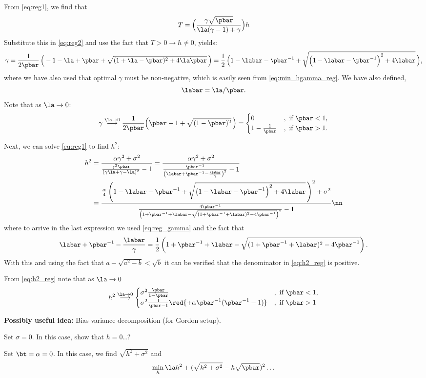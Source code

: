 From \eqref{eq:reg1}, we find that 
\begin{align}
T =\Big( \frac{\gamma\sqrt{\pbar}}{\la(\gamma-1)+\gamma}\Big) h
\end{align}
Substitute this in \eqref{eq:reg2} and use the fact that $T>0\rightarrow h\neq 0$, yields:
\begin{align}
\gamma = \frac{1}{2\pbar}\,\Big( -1 - \la + \pbar + \sqrt{(1+\la-\pbar)^2+4\la \pbar} \,\Big) = \frac{1}{2}\,\Big( 1 - \labar -\pbar^{-1} + \sqrt{\Big(1 - \labar-\pbar^{-1} \Big)^2+4\labar} \,\Big)\label{eq:reg_gamma},
\end{align}
where we have also used that optimal $\gamma$ must be non-negative, which is easily seen from \eqref{eq:min_hgamma_reg}. We have also defined,
$$
\labar = \la/\pbar. 
$$
 Note that as $\la\rightarrow0$:
$$
\gamma \stackrel{\la\rightarrow0}{\longrightarrow}  \frac{1}{2\pbar}\Big( \pbar - 1 + \sqrt{(1-\pbar)^2} \,\Big) = \begin{cases}
0 &, \text{ if } \pbar<1,\\
1-\frac{1}{\pbar} &, \text{ if } \pbar>1.
\end{cases}
$$

Next, we can solve \eqref{eq:reg1} to find $h^2$:
\begin{align}\label{eq:h2_reg}
h^2 &= \frac{\alpha\gamma^2+\sigma^2}{\frac{\gamma^2 \pbar}{(\gamma\la+\gamma-\la)^2}-1} = \frac{\alpha\gamma^2+\sigma^2}{\frac{\pbar^{-1}}{\left(\labar+\pbar^{-1}-\frac{\labar}{\gamma}\right)^2}-1}\\
&= \frac{\frac{\alpha}{4}\left( 1 - \labar -\pbar^{-1} + \sqrt{\big(1 - \labar-\pbar^{-1} \Big)^2+4\labar} \,\right)^2 + \sigma^2}{\frac{4\pbar^{-1}}{\left(1+\pbar^{-1} + \labar - \sqrt{(1+\pbar^{-1} + \labar)^2-4\pbar^{-1}} \right)^2}-1}\nn
\end{align}
where to arrive in the last expression we used \eqref{eq:reg_gamma} and the fact that
$$
\labar+\pbar^{-1}-\frac{\labar}{\gamma} = \frac{1}{2}\left(1+\pbar^{-1} + \labar - \sqrt{(1+\pbar^{-1} + \labar)^2-4\pbar^{-1}} \right).
$$
With this and using the fact that $a-\sqrt{a^2-b}<\sqrt{b}$ it can be verified that the denominator in \eqref{eq:h2_reg} is positive. 

From \eqref{eq:h2_reg} note that as $\la\rightarrow 0$
$$
h^2 \stackrel{\la\rightarrow0}{\longrightarrow}  \begin{cases}
\sigma^2\frac{\pbar}{1-\pbar} &, \text{ if } \pbar<1,\\
\sigma^2\frac{1}{\pbar-1} \red{+ \alpha \pbar^{-1}(\pbar^{-1}-1)} &, \text{ if } \pbar>1
\end{cases}
$$

{\bf{Possibly useful idea:}} Bias-variance decomposition (for Gordon setup). 

 Set $\sigma=0$. In this case, show that $h=0$\dots?

 Set $\bt=\alpha=0$. In this case, we find $\sqrt{h^2+\sigma^2}$ and
\[
\min_{h} \la h^2+(\sqrt{h^2+\sigma^2}-h\sqrt{\pbar})^2\dots
\]
\newpage
